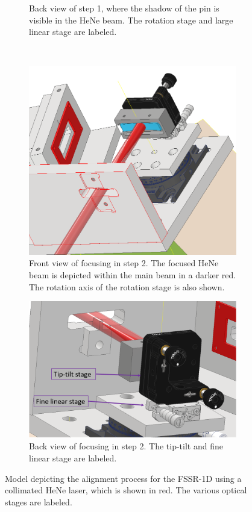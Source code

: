 \begin{figure} [H]
\begin{subfigure}[t]{0.56\textwidth}
		\caption{Back view of step 1, where the shadow of the pin is 
		visible in the HeNe beam. The rotation stage and large linear 
		stage are labeled.}
		\label{InvFSSRAlignment12}
	\end{subfigure}\\[1ex]
	\centering
	\begin{subfigure}[t]{0.48\textwidth}
	\centering
		\includegraphics[width=\textwidth]{InventorPics/Alignment2.1.PNG}
		\caption{Front view of focusing in step 2. The focused HeNe 
		beam is depicted within the main beam in a darker red. The 
		rotation axis of the rotation stage is also shown.}
		\label{InvFSSRAlignment21}
	\end{subfigure}%
	\hfill
	\begin{subfigure}[t]{0.48\textwidth}
	\centering
		\includegraphics[width=\textwidth]{InventorPics/Alignment2.2.PNG}
		\caption{Back view of focusing in step 2. The tip-tilt and fine 
		linear stage are labeled.}
		\label{InvFSSRAlignment22}
	\end{subfigure}
	\caption{Model depicting the alignment process for the FSSR-1D 
	using a collimated HeNe laser, which is shown in red. The various 
	optical stages are labeled.}
	\label{InvFSSRAlignment}
\end{figure}

